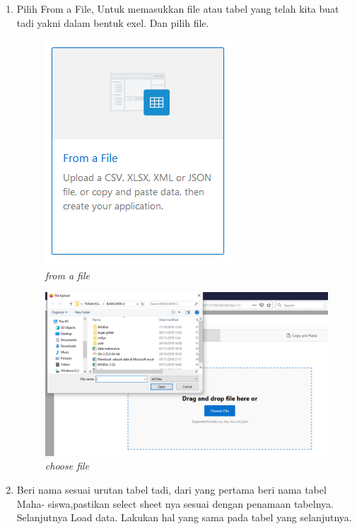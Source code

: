 \begin{enumerate}
    \item Pilih From a File, Untuk memasukkan file atau tabel yang telah kita buat tadi yakni dalam bentuk exel. Dan pilih file.
    
    \begin{figure}[!htbp]
        \centering
        \includegraphics[scale=0.5]{figure/from_a_file.PNG}
        \caption{\textit{from a file}}
        \label{fig:my_label}
    \end{figure}
    
    \begin{figure}[!htbp]
        \centering
        \includegraphics[scale=0.5]{figure/choose_file.PNG}
        \caption{\textit{choose file}}
        \label{fig:my_label}
    \end{figure}
    
    \newpage
    \item Beri nama sesuai urutan tabel tadi, dari yang pertama beri nama tabel Maha- siswa,pastikan select sheet nya sesuai dengan penamaan tabelnya. Selanjutnya Load data. Lakukan hal yang sama pada tabel yang selanjutnya.
    

\end{enumerate}
